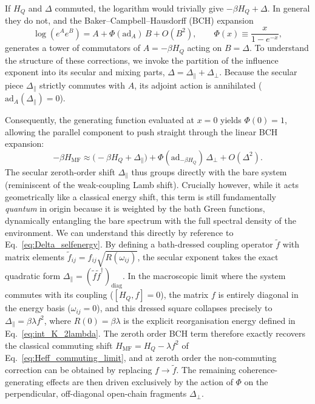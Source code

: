 If $H_Q$ and $\Delta$ commuted, the logarithm would trivially give $-\beta H_Q+\Delta$. In general
they do not, and the Baker--Campbell--Hausdorff (BCH) expansion
\begin{equation}
    \log(e^A e^B) = A + \Phi(\mathrm{ad}_A)\,B + O(B^2),
    \qquad
    \Phi(x)\equiv\frac{x}{1-e^{-x}},
    \label{eq:BCH_linear}
\end{equation}
generates a tower of commutators of $A=-\beta H_Q$ acting on $B=\Delta$. To understand the structure of these corrections, we invoke the partition of the influence exponent into its secular and mixing parts, $\Delta = \Delta_{\parallel} + \Delta_{\perp}$. Because the secular piece $\Delta_{\parallel}$ strictly commutes with $A$, its adjoint action is annihilated ($\mathrm{ad}_A(\Delta_{\parallel}) = 0$).

Consequently, the generating function evaluated at $x=0$ yields $\Phi(0)=1$, allowing the parallel component to push straight through the linear BCH expansion:
\begin{equation}
    -\beta H_{\mathrm{MF}} \approx \big(-\beta H_Q + \Delta_{\parallel}\big) + \Phi(\mathrm{ad}_{-\beta H_Q})\,\Delta_{\perp} + O(\Delta^2).
    \label{eq:BCH_split_linear}
\end{equation}
The secular zeroth-order shift $\Delta_{\parallel}$ thus groups directly with the bare system (reminiscent of the weak-coupling Lamb shift). Crucially however, while it acts geometrically like a classical energy shift, this term is still fundamentally \textit{quantum} in origin because it is weighted by the bath Green functions, dynamically entangling the bare spectrum with the full spectral density of the environment. We can understand this directly by reference to Eq.~\eqref{eq:Delta_selfenergy}. By defining a bath-dressed coupling operator $\tilde f$ with matrix elements $\tilde f_{ij} = f_{ij}\sqrt{R(\omega_{ij})}$, the secular exponent takes the exact quadratic form $\Delta_{\parallel} = (\tilde f \tilde f^\dagger)_{\text{diag}}$. In the macroscopic limit where the system commutes with its coupling ($[H_Q, f]=0$), the matrix $f$ is entirely diagonal in the energy basis ($\omega_{ij}=0$), and this dressed square collapses precisely to $\Delta_{\parallel} = \beta\lambda f^2$, where $R(0) = \beta\lambda$ is the explicit reorganisation energy defined in Eq.~\eqref{eq:int_K_2lambda}. The zeroth order BCH term therefore exactly recovers the classical commuting shift $H_{\mathrm{MF}} = H_Q - \lambda f^2$ of Eq.~\eqref{eq:Heff_commuting_limit}, and at zeroth order the non-commuting correction can be obtained by replacing $f \to \tilde f$. The remaining coherence-generating effects are then driven exclusively by the action of $\Phi$ on the perpendicular, off-diagonal open-chain fragments $\Delta_{\perp}$.



